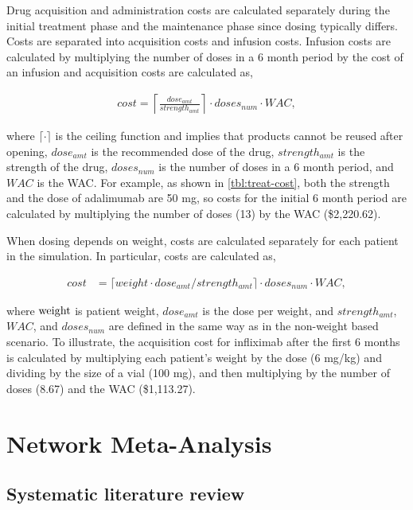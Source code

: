 \documentclass[11pt,final,fleqn]{article}\usepackage[]{graphicx}\usepackage[]{color}
\theoremstyle{plain}
\begin{document}
\begin{appendices}
Drug acquisition and administration costs are calculated separately during the initial treatment phase and the maintenance phase since dosing typically differs. Costs are separated into acquisition costs and infusion costs. Infusion costs are calculated by multiplying the number of doses in a 6 month period by the cost of an infusion and acquisition costs are calculated as,

\begin{align}
cost = \left\lceil\frac{dose_{amt}}{strength_{amt}}\right\rceil \cdot doses_{num} \cdot WAC,
\end{align}

where $\lceil\cdot\rceil$ is the ceiling function and implies that products cannot be reused after opening, $dose_{amt}$ is the recommended dose of the drug, $strength_{amt}$ is the strength of the drug, $doses_{num}$ is the number of doses in a 6 month period, and $WAC$ is the WAC. For example, as shown in \autoref{tbl:treat-cost}, both the strength and the dose of adalimumab are 50 mg, so costs for the initial 6 month period are calculated by multiplying the number of doses (13) by the WAC (\$2,220.62).

When dosing depends on weight, costs are calculated separately for each patient in the simulation. In particular, costs are calculated as,

\begin{align}
cost &= \lceil weight \cdot dose_{amt}/strength_{amt}\rceil \cdot doses_{num} \cdot WAC,
\end{align}

where $\rm{weight}$ is patient weight, $dose_{amt}$ is the dose per weight, and $strength_{amt}$, $WAC$, and $doses_{num}$ are defined in the same way as in the non-weight based scenario. To illustrate, the acquisition cost for infliximab after the first 6 months is calculated by multiplying each patient's weight by the dose (6 mg/kg) and dividing by the size of a vial (100 mg), and then multiplying by the number of doses (8.67) and the WAC (\$1,113.27).  

\section{Network Meta-Analysis}\label{appendix:NMA}

\subsection{Systematic literature review}\label{systematic-literature-review}


\end{appendices}
\end{document}
